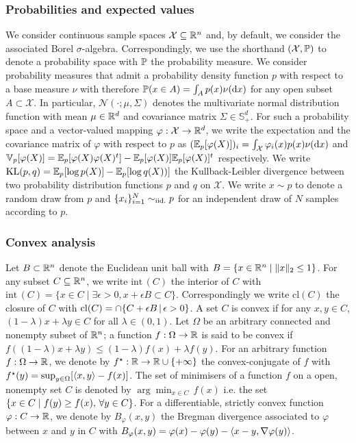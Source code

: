 \subsubsection{Probabilities and expected values}
We consider continuous sample spaces $\mathcal X\subseteq \R^{n}$ and, by default, we consider the associated Borel $\sigma$-algebra. Correspondingly, we use the shorthand $(\mathcal X,\P)$ to denote a probability space with $\P$ the probability measure. We consider probability measures that admit a probability density function $p$ with respect to a base measure $\nu$ with therefore $\P(x\in A)=\int_{A}p(x)\nudx$ for any open subset $A\subset \mathcal X$. In particular, $\mathcal N(\cdot; \mu,\Sigma)$ denotes the multivariate normal distribution function with mean $\mu\in \R^{d}$ and covariance matrix $\Sigma\in\mathbb S^{d}_+$. For such a probability space and a vector-valued mapping $\varphi:\mathcal X\to\R^{d}$, we write the expectation and the covariance matrix of $\varphi$ with respect to $p$ as $(\E_{p}[\varphi(X)])_{i}=\int_{\mathcal X}\varphi_{i}(x)p(x)\nudx$ and $\V_{p}[\varphi(X)]=\E_{p}[\varphi(X)\varphi(X)^{t}]-\E_{p}[\varphi(X)]\E_{p}[\varphi(X)]^{t}$ respectively. We write $\KL{p,q}=\E_{p}[\log p(X)]-\E_{p}[\log q(X))]$ the Kullback-Leibler divergence between two probability distribution functions $p$ and $q$ on $\mathcal X$. We write $x\sim p$ to denote a random draw from $p$ and $\{x_i\}_{i=1}^{N}\simiid p$ for an independent draw of $N$ samples according to $p$. 
 
\subsubsection{Convex analysis}
Let $B\subset\R^{n}$ denote the Euclidean unit ball with $B=\{x\in\R^{n}\mid \|x\|_{2}\le 1\}$. For any subset $C\subseteq\R^{n}$, we write $\mathrm{int}\,(C)$ the interior of $C$ with $\mathrm{int}\,(C)=\{x\in C \mid \exists \epsilon>0, x+\epsilon B \subset C\}$. Correspondingly we write $\mathrm{cl}(C)$ the closure of $C$ with $\mathrm{cl}(C) = \cap\{C+\epsilon B\st \epsilon>0\}$. A set $C$ is convex if for any $x,y\in C$, $(1-\lambda)x+\lambda y\in C$ for all $\lambda\in(0,1)$. Let $\Omega$ be an arbitrary connected and nonempty subset of $\R^{n}$; a function $f:\Omega\to\R$ is said to be convex if $f((1-\lambda)x+\lambda y)\le (1-\lambda)f(x)+\lambda f(y)$. For an arbitrary function $f:\Omega\to\R$, we denote by $f^{\star}:\R\to \R\cup\{+\infty\}$ the convex-conjugate of $f$ with $f^{\star}(y)=\sup_{y\in \Omega}[\scal{x,y}-f(x)]$. The set of minimisers of a function $f$ on a open, nonempty set $C$ is denoted by $\arg\min_{x\in C}\,f(x)$ i.e. the set $\pab{x\in C\mid f(y)\ge f(x), \,\forall y\in C}$. For a differentiable, strictly convex function $\varphi:C\to\R$, we denote by $B_\varphi(x,y)$ the Bregman divergence associated to $\varphi$ between $x$ and $y$ in $C$ with $B_\varphi(x,y)=\varphi(x)-\varphi(y)-\scal{x-y,\nabla \varphi(y)}$.  

